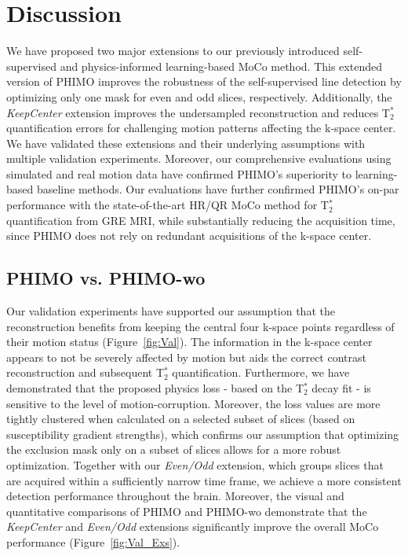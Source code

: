 \documentclass[AMA,STIX2COL]{MRM}
\newcommand{\tstar}[1]{{T$_2^*$}}
\begin{document}
\section{Discussion}\label{sec:disc}
We have proposed two major extensions to our previously introduced self-supervised and physics-informed learning-based MoCo method.\cite{Eichhorn_2024} This extended version of PHIMO improves the robustness of the self-supervised line detection by optimizing only one mask for even and odd slices, respectively. Additionally, the \textit{KeepCenter} extension improves the undersampled reconstruction and reduces \tstar{} quantification errors for challenging motion patterns affecting the k-space center. We have validated these extensions and their underlying assumptions with multiple validation experiments. Moreover, our comprehensive evaluations using simulated and real motion data have confirmed PHIMO's superiority to learning-based baseline methods. Our evaluations have further confirmed PHIMO's on-par performance with the state-of-the-art HR/QR MoCo method for \tstar{} quantification from GRE MRI,\cite{Noth_2014} while substantially reducing the acquisition time, since PHIMO does not rely on redundant acquisitions of the k-space center.


\subsection{PHIMO vs. PHIMO-wo}
Our validation experiments have supported our assumption that the reconstruction benefits from keeping the central four k-space points regardless of their motion status (Figure~\ref{fig:Val}). The information in the k-space center appears to not be severely affected by motion but aids the correct contrast reconstruction and subsequent \tstar{} quantification. 
Furthermore, we have demonstrated that the proposed physics loss - based on the \tstar{} decay fit - is sensitive to the level of motion-corruption. Moreover, the loss values are more tightly clustered when calculated on a selected subset of slices (based on susceptibility gradient strengths), which confirms our assumption that optimizing the exclusion mask only on a subset of slices allows for a more robust optimization. Together with our \textit{Even/Odd} extension, which groups slices that are acquired within a sufficiently narrow time frame, we achieve a more consistent detection performance throughout the brain.
Moreover, the visual and quantitative comparisons of PHIMO and PHIMO-wo\cite{Eichhorn_2024} demonstrate that the \textit{KeepCenter} and \textit{Even/Odd} extensions significantly improve the overall MoCo performance (Figure~\ref{fig:Val_Exs}).
\end{document}
